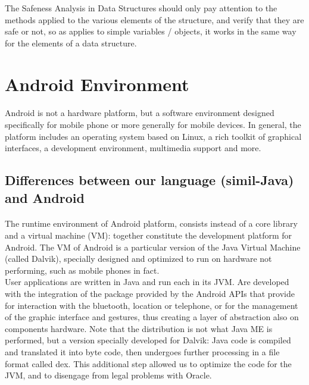 \documentclass[letterpaper,twocolumn,10pt]{article}
\begin{document}
The Safeness Analysis in Data Structures should only pay attention to the methods applied to the various elements of the structure, and verify that they are safe or not, so as applies to simple variables / objects, it works in the same way for the elements of a data structure.




\section{Android Environment}
\paragraph{}
Android is not a hardware platform, but a software environment designed specifically for mobile phone or more generally for mobile devices. In general, the platform includes an operating system based on Linux, a rich toolkit of graphical interfaces, a development environment, multimedia support and more.

\subsection{Differences between our language (simil-Java) and Android}
\paragraph{}
The runtime environment of Android platform, consists instead of a core library and a virtual machine (VM): together constitute the development platform for Android. The VM of Android is a particular version of the Java Virtual Machine (called Dalvik), specially designed and optimized to run on hardware not performing, such as mobile phones in fact.\\

User applications are written in Java and run each in its JVM. Are developed with the integration of the package provided by the Android APIs that provide for interaction with the bluetooth, location or telephone, or for the management of the graphic interface and gestures, thus creating a layer of abstraction also on components hardware. Note that the distribution is not what Java ME is performed, but a version specially developed for Dalvik: Java code is compiled and translated it into byte code, then undergoes further processing in a file format called dex. This additional step allowed us to optimize the code for the JVM, and to disengage from legal problems with Oracle.
\end{document}
